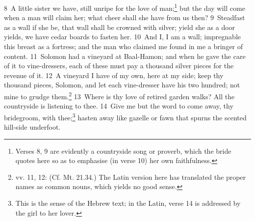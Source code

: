 \documentclass[10pt]{book} %
\begin{document}
\textcolor{benred8}{8}~A little sister we have, still unripe for the love of man;\footnote[4]{Verses 8, 9 are evidently a countryside song or proverb, which the bride quotes here so as to emphasise (in verse 10) her own faithfulness.} but the day will come when a man will claim her; what cheer shall she have from us then? \textcolor{benred8}{9}~Steadfast as a wall if she be, that wall shall be crowned with silver; yield she as a door yields, we have cedar boards to fasten her. \textcolor{benred8}{10}~And I, I am a wall; impregnable this breast as a fortress; and the man who claimed me found in me a bringer of content.
\textcolor{benred8}{11}~Solomon had a vineyard at Baal-Hamon; and when he gave the care of it to vine-dressers, each of these must pay a thousand silver pieces for the revenue of it. \textcolor{benred8}{12}~A vineyard I have of my own, here at my side; keep thy thousand pieces, Solomon, and let each vine-dresser have his two hundred; not mine to grudge them.\footnote[5]{vv. 11, 12: (Cf. Mt. 21.34.) The Latin version here has translated the proper names as common nouns, which yields no good sense.}
\textcolor{benred8}{13}~Where is thy love of retired garden walks? All the countryside is listening to thee. \textcolor{benred8}{14}~Give me but the word to come away, thy bridegroom, with thee;\footnote[6]{This is the sense of the Hebrew text; in the Latin, verse 14 is addressed by the girl to her lover.} hasten away like gazelle or fawn that spurns the scented hill-side underfoot.
\end{document}
